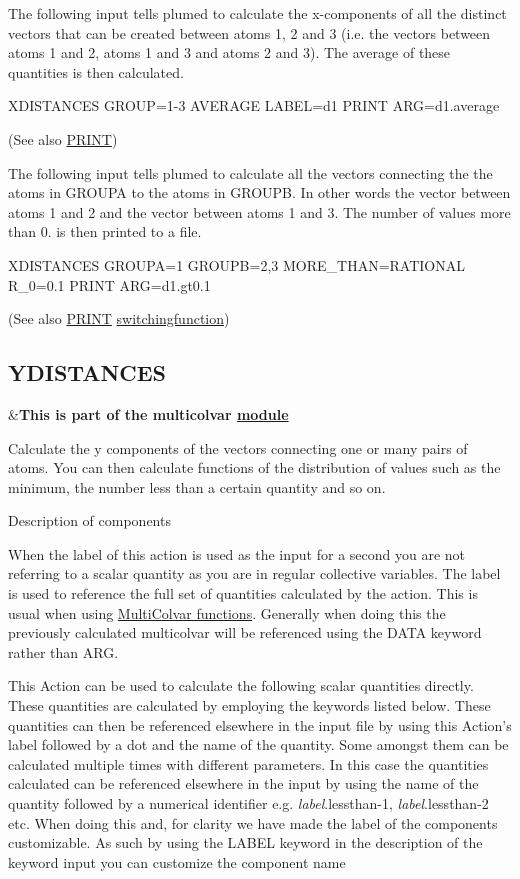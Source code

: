 The following input tells plumed to calculate the x-\/components of all the distinct vectors that can be created between atoms 1, 2 and 3 (i.\+e. the vectors between atoms 1 and 2, atoms 1 and 3 and atoms 2 and 3). The average of these quantities is then calculated. \begin{DoxyVerb}XDISTANCES GROUP=1-3 AVERAGE LABEL=d1
PRINT ARG=d1.average
\end{DoxyVerb}
 (See also \hyperlink{PRINT}{P\+R\+I\+N\+T})

The following input tells plumed to calculate all the vectors connecting the the atoms in G\+R\+O\+U\+P\+A to the atoms in G\+R\+O\+U\+P\+B. In other words the vector between atoms 1 and 2 and the vector between atoms 1 and 3. The number of values more than 0. is then printed to a file. \begin{DoxyVerb}XDISTANCES GROUPA=1 GROUPB=2,3 MORE_THAN={RATIONAL R_0=0.1}
PRINT ARG=d1.gt0.1 
\end{DoxyVerb}
 (See also \hyperlink{PRINT}{P\+R\+I\+N\+T} \hyperlink{switchingfunction}{switchingfunction}) \hypertarget{YDISTANCES}{}\subsection{Y\+D\+I\+S\+T\+A\+N\+C\+E\+S}\label{YDISTANCES}
\begin{TabularC}{2}
\hline
&{\bfseries  This is part of the multicolvar \hyperlink{mymodules}{module }}   \\
\end{TabularC}
Calculate the y components of the vectors connecting one or many pairs of atoms. You can then calculate functions of the distribution of values such as the minimum, the number less than a certain quantity and so on.

\begin{DoxyParagraph}{Description of components}

\end{DoxyParagraph}
When the label of this action is used as the input for a second you are not referring to a scalar quantity as you are in regular collective variables. The label is used to reference the full set of quantities calculated by the action. This is usual when using \hyperlink{mcolv_multicolvarfunction}{Multi\+Colvar functions}. Generally when doing this the previously calculated multicolvar will be referenced using the D\+A\+T\+A keyword rather than A\+R\+G.

This Action can be used to calculate the following scalar quantities directly. These quantities are calculated by employing the keywords listed below. These quantities can then be referenced elsewhere in the input file by using this Action's label followed by a dot and the name of the quantity. Some amongst them can be calculated multiple times with different parameters. In this case the quantities calculated can be referenced elsewhere in the input by using the name of the quantity followed by a numerical identifier e.\+g. {\itshape label}.lessthan-\/1, {\itshape label}.lessthan-\/2 etc. When doing this and, for clarity we have made the label of the components customizable. As such by using the L\+A\+B\+E\+L keyword in the description of the keyword input you can customize the component name

